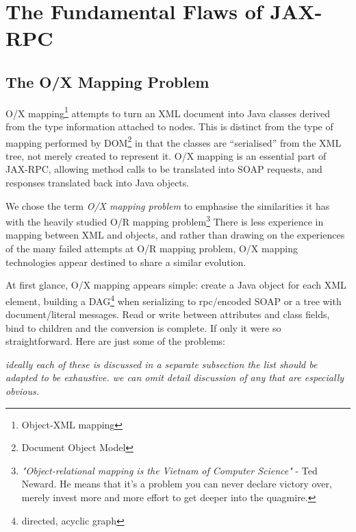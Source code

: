\section{The Fundamental Flaws of JAX-RPC}
\label{objections:top}

\subsection{The O/X Mapping Problem}
\label{objections:o-x}

O/X mapping\footnote{Object-XML mapping} attempts to turn an XML
document into Java classes derived from the type information attached
to nodes. This is distinct from the type of mapping performed by
DOM\footnote{Document Object Model} in that the classes are
``serialised'' from the XML tree, not merely created to represent it. 
O/X mapping is an essential part of JAX-RPC, allowing method calls to
be translated into SOAP requests, and responses translated back into
Java objects.

We chose the term \emph{O/X mapping problem} to emphasise the
similarities it has with the heavily studied O/R mapping
problem\footnote{ \emph{"Object-relational mapping is the Vietnam of
Computer Science"} - Ted Neward. He means that it's a problem you can
never declare victory over, merely invest more and more effort to get
deeper into the quagmire.
}
There is less experience in mapping between XML and objects, and
rather than drawing on the experiences of the many failed attempts at
O/R mapping problem, O/X mapping technologies appear destined to share
a similar evolution.

At first glance, O/X mapping appears simple: create a Java object
for each XML element, building a DAG\footnote{directed, acyclic graph}
when serializing to rpc/encoded SOAP or a tree with document/literal
messages. Read or write between attributes and class fields, bind to
children and the conversion is complete. If only it were so
straightforward. Here are just some of the problems:

\emph{ideally each of these is discussed in a separate subsection
the list should be adapted to be exhaustive. we can omit detail
discussion of any that are especially obvious.}

